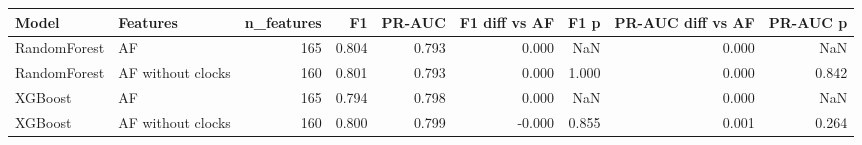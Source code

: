 \begin{tabular}{llrrrrrrr}
\toprule
Model & Features & n_features & F1 & PR-AUC & F1 diff vs AF & F1 p & PR-AUC diff vs AF & PR-AUC p \\
\midrule
RandomForest & AF & 165 & 0.804 & 0.793 & 0.000 & NaN & 0.000 & NaN \\
RandomForest & AF without clocks & 160 & 0.801 & 0.793 & 0.000 & 1.000 & 0.000 & 0.842 \\
XGBoost & AF & 165 & 0.794 & 0.798 & 0.000 & NaN & 0.000 & NaN \\
XGBoost & AF without clocks & 160 & 0.800 & 0.799 & -0.000 & 0.855 & 0.001 & 0.264 \\
\bottomrule
\end{tabular}
